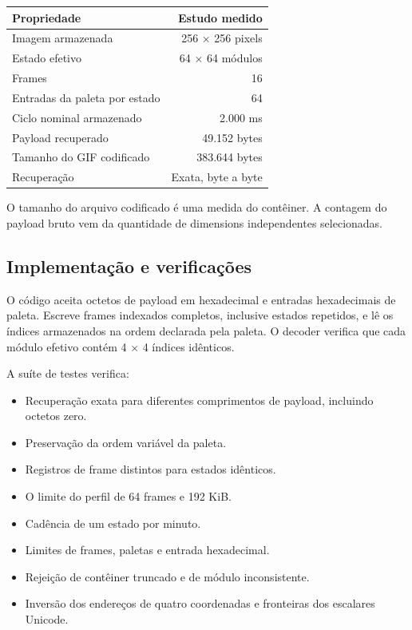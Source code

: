 \documentclass[
  11pt,
  a4paper,
]{article}
\providecommand{\tightlist}{%
  \setlength{\itemsep}{0pt}\setlength{\parskip}{0pt}}
\begin{document}
\begin{longtable}[]{@{}lr@{}}
\toprule\noalign{}
Propriedade & Estudo medido \\
\midrule\noalign{}
\endhead
\bottomrule\noalign{}
\endlastfoot
Imagem armazenada & 256 × 256 pixels \\
Estado efetivo & 64 × 64 módulos \\
Frames & 16 \\
Entradas da paleta por estado & 64 \\
Ciclo nominal armazenado & 2.000 ms \\
Payload recuperado & 49.152 bytes \\
Tamanho do GIF codificado & 383.644 bytes \\
Recuperação & Exata, byte a byte \\
\end{longtable}

O tamanho do arquivo codificado é uma medida do contêiner. A contagem do
payload bruto vem da quantidade de dimensions independentes
selecionadas.

\hypertarget{implementauxe7uxe3o-e-verificauxe7uxf5es}{%
\subsection{Implementação e
verificações}\label{implementauxe7uxe3o-e-verificauxe7uxf5es}}

O código aceita octetos de payload em hexadecimal e entradas
hexadecimais de paleta. Escreve frames indexados completos, inclusive
estados repetidos, e lê os índices armazenados na ordem declarada pela
paleta. O decoder verifica que cada módulo efetivo contém 4 × 4 índices
idênticos.

A suíte de testes verifica:

\begin{itemize}
\tightlist
\item
  Recuperação exata para diferentes comprimentos de payload, incluindo
  octetos zero.
\item
  Preservação da ordem variável da paleta.
\item
  Registros de frame distintos para estados idênticos.
\item
  O limite do perfil de 64 frames e 192 KiB.
\item
  Cadência de um estado por minuto.
\item
  Limites de frames, paletas e entrada hexadecimal.
\item
  Rejeição de contêiner truncado e de módulo inconsistente.
\item
  Inversão dos endereços de quatro coordenadas e fronteiras dos
  escalares Unicode.
\end{itemize}
\end{document}
